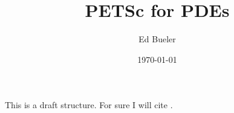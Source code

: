 \documentclass[11pt,reqno]{amsart}
\title{PETSc for PDEs}
\author{Ed Bueler}
\date{\today}
\begin{document}
\maketitle

\thispagestyle{empty}

This is a draft structure.  For sure I will cite \cite{Smithetal1996}.

\bigskip
\small


\end{document}
